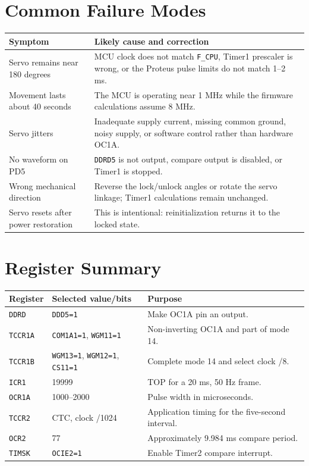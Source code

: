 \documentclass[11pt,a4paper]{article}
\begin{document}
\section{Common Failure Modes}
\begin{longtable}{p{}p{}}
\toprule
Symptom & Likely cause and correction \\
\midrule
\endhead
Servo remains near 180 degrees & MCU clock does not match \texttt{F\_CPU}, Timer1 prescaler is wrong, or the Proteus pulse limits do not match 1--2 ms. \\
Movement lasts about 40 seconds & The MCU is operating near 1 MHz while the firmware calculations assume 8 MHz. \\
Servo jitters & Inadequate supply current, missing common ground, noisy supply, or software control rather than hardware OC1A. \\
No waveform on PD5 & \texttt{DDRD5} is not output, compare output is disabled, or Timer1 is stopped. \\
Wrong mechanical direction & Reverse the lock/unlock angles or rotate the servo linkage; Timer1 calculations remain unchanged. \\
Servo resets after power restoration & This is intentional: reinitialization returns it to the locked state. \\
\bottomrule
\end{longtable}

\section{Register Summary}
\begin{longtable}{p{}p{}p{}}
\toprule
Register & Selected value/bits & Purpose \\
\midrule
\endhead
\texttt{DDRD} & \texttt{DDD5=1} & Make OC1A pin an output. \\
\texttt{TCCR1A} & \texttt{COM1A1=1}, \texttt{WGM11=1} & Non-inverting OC1A and part of mode 14. \\
\texttt{TCCR1B} & \texttt{WGM13=1}, \texttt{WGM12=1}, \texttt{CS11=1} & Complete mode 14 and select clock /8. \\
\texttt{ICR1} & 19999 & TOP for a 20 ms, 50 Hz frame. \\
\texttt{OCR1A} & 1000--2000 & Pulse width in microseconds. \\
\texttt{TCCR2} & CTC, clock /1024 & Application timing for the five-second interval. \\
\texttt{OCR2} & 77 & Approximately 9.984 ms compare period. \\
\texttt{TIMSK} & \texttt{OCIE2=1} & Enable Timer2 compare interrupt. \\
\bottomrule
\end{longtable}
\end{document}
